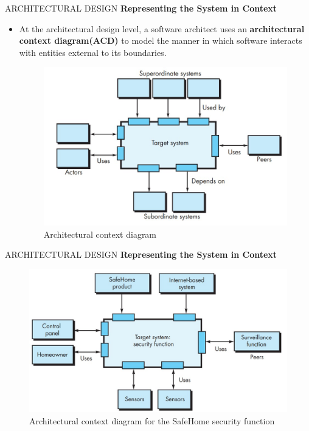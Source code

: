 \documentclass{beamer}
\begin{document}
\begin{frame}{ARCHITECTURAL DESIGN}
	\textbf{Representing the System in Context}
	\begin{itemize}
		\item At the architectural design level, a software architect uses an \textbf{architectural context diagram(ACD)} to model the manner in which 
		software interacts with entities external to its boundaries. 
		
		\begin{figure}
			\includegraphics[scale=.45]{img/m2_40.jpg}
			\caption{Architectural context diagram}
		\end{figure}
		
	\end{itemize}
\end{frame}
\begin{frame}{ARCHITECTURAL DESIGN}
	\textbf{Representing the System in Context}
	
		\begin{figure}
			\includegraphics[scale=.45]{img/m2_41.jpg}
			\caption{Architectural 
				context 
				diagram for 
				the SafeHome
				security 
				function}
		\end{figure}
		

\end{frame}
\end{document}

